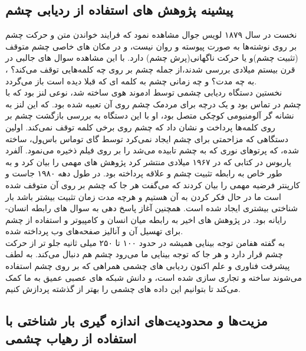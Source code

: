 \subsection{پیشینه پژوهش های استفاده از ردیابی چشم}

نخست در سال ۱۸۷۹ لویس جوال مشاهده نمود که فرایند خواندن متن و حرکت چشم بر روی نوشته‌ها به صورت پیوسته و روان نیست، و در مکان های خاصی چشم متوقف (تثبیت چشم)و یا حرکت ناگهانی(پرش چشم) دارد.
با این مشاهده سوال های جالبی در قرن بیستم میلادی بررسی شدند،‌از جمله چشم بر روی چه کلمه‌‌هایی توقف می‌کند؟ ، به چه مدت؟ و چه زمانی چشم به کلمه ای که قبلا دیده است باز می‌گردد.
\\
نخستین دستگاه ردیابی چشمی توسط ادموند هوی ساخته شد، نوعی  لنز بود که با چشم در تماس بود و یک درچه برای مردمک چشم روی آن تعبیه شده بود. که این لنز به نشانه گر آلومنیومی کوچکی متصل بود، او با این دستگاه به بررسی بازگشت چشم بر روی کلمه‌ها پرداخت و نشان داد که چشم روی برخی کلمه توقف نمی‌کند.
اولین دستگاهی که مزاحمتی برای چشم ایجاد نمی‌کرد توسط گای توماس باس‌ول، ساخته شده، که پرتوهای نوری که به چشم تابیده می‌شد را بر روی فیلم ذخیره می‌نمود. آلفرد یاربوس در کتابی که در ۱۹۶۷ میلادی منتشر کرد پژوهش های مهمی را بیان کرد و به طور خاص به رابطه تثبیت چشم و علاقه پرداخته بود.
در طول دهه ۱۹۸۰ جاست و کارپنتر فرضیه مهمی را بیان کردند که می‌گفت هر جا که چشم بر روی آن متوقف شده است ما در حال فکر کردن به آن هستیم و هرچه مدت زمان تثبیت بیشتر باشد بار شناختی بیشتری ایجاد شده است.
همچنین آغاز پاسخ دهی به سوال های رابطه انسان-رایانه بود.
در پژوهش های اخیر به رابطه میان انسان و کامپیوتر و استفاده از چشم برای تهسیل آن و آنالیز صفحه‌های وب پرداخته شده.
\\
به گفته هفامن توجه بینایی همیشه در حدود ۱۰۰ تا ۲۵۰ میلی ثانیه جلو تر از حرکت چشم قرار دارد و هر جا که توجه بینایی ما می‌رود چشم هم دنبال می‌کند.
\cite{deubel1996saccade}
به لطف پیشرفت فناوری و علم اکنون ردیابی های چشمی همراهی که بر روی چشم استفاده می‌شوند ساخته و تجاری سازی شده است، و دانش شبکه های عصبی عمیق
به ما کمک می‌کند تا بتوانیم این داده های چشمی را بهتر از گذشته پردازش کنیم.
\cite{wiki:EYET}
\subsection{مزیت‌ها و محدودیت‌ها‌ی اندازه گیری بار شناختی با استفاده از رهیاب چشمی}
\label{ss:ProVsCon}

